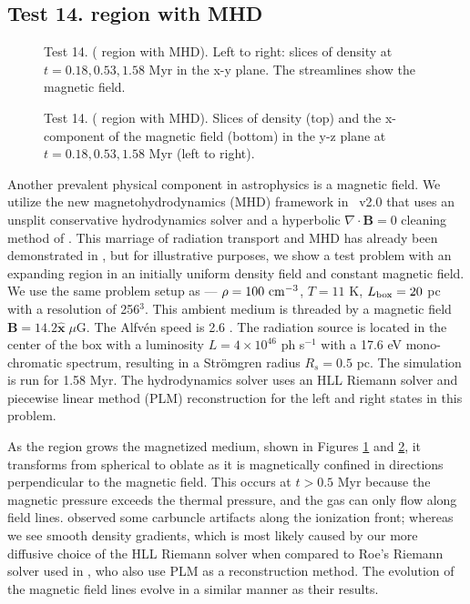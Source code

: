 \documentclass[apj,onecolumn]{emulateapj}
\begin{document}
\subsection{Test 14.  region with MHD}

\begin{figure}[t]
  \caption{\label{fig:test14_1} Test 14. ( region with MHD).
    Left to right: slices of density at $t = 0.18, 0.53, 1.58$ Myr in
    the x-y plane.  The streamlines show the magnetic field.}
\end{figure}

\begin{figure}[t]
  \caption{\label{fig:test14_2} Test 14. ( region with
    MHD). Slices of density (top) and the x-component of the magnetic
    field (bottom) in the y-z plane at $t = 0.18, 0.53, 1.58$ Myr
    (left to right).}
\end{figure}

Another prevalent physical component in astrophysics is a magnetic
field.  We utilize the new magnetohydrodynamics (MHD) framework
\citep{Wang09} in \enzo~v2.0 that uses an unsplit conservative
hydrodynamics solver and a hyperbolic $\nabla \cdot \mathbf{B} = 0$
cleaning method of \citet{Dedner02}.  This marriage of radiation
transport and MHD has already been demonstrated in \citet{Wang10}, but
for illustrative purposes, we show a test problem with an expanding
 region in an initially uniform density field and constant
magnetic field.  We use the same problem setup as
\citet{Krumholz07_ART} --- $\rho = 100~\cubecm$, $T = 11$ K, $L_{\rm
  box} = 20$ pc with a resolution of 256$^3$.  This ambient medium is
threaded by a magnetic field $\mathbf{B} = 14.2 \hat{\mathbf{x}} \;
\mu\mathrm{G}$.  The Alfv\'{e}n speed is 2.6 \kms.  The radiation
source is located in the center of the box with a luminosity $L = 4
\times 10^{46}$ ph s$^{-1}$ with a 17.6 eV mono-chromatic spectrum,
resulting in a Str\"{o}mgren radius $R_s = 0.5$ pc.  The simulation is
run for 1.58 Myr.  The hydrodynamics solver uses an HLL Riemann solver
\citep{HLL} and piecewise linear method (PLM) reconstruction
\citep{PLM} for the left and right states in this problem.

As the  region grows the magnetized medium, shown in Figures
\ref{fig:test14_1} and \ref{fig:test14_2}, it transforms from
spherical to oblate as it is magnetically confined in directions
perpendicular to the magnetic field.  This occurs at $t > 0.5$ Myr
because the magnetic pressure exceeds the thermal pressure, and the
gas can only flow along field lines.  \citeauthor{Krumholz07_ART}
observed some carbuncle artifacts along the ionization front; whereas
we see smooth density gradients, which is most likely caused by our
more diffusive choice of the HLL Riemann solver when compared to Roe's
Riemann solver used in \citet{Krumholz07_ART}, who also use PLM as a
reconstruction method.  The evolution of the magnetic field lines
evolve in a similar manner as their results.
\end{document}
